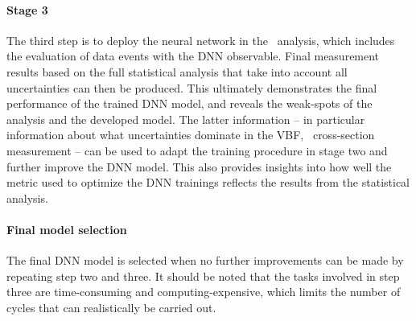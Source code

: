 \paragraph{Stage 3}
The third step is to deploy the neural network in the \HWW\ analysis, which includes the evaluation of data events with the DNN observable. Final measurement results based on the full statistical analysis that take into account all uncertainties can then be produced. This ultimately demonstrates the final performance of the trained DNN model, and reveals the weak-spots of the analysis and the developed model.
The latter information -- in particular information about what uncertainties dominate in the VBF, \HWW\ cross-section measurement -- can be used to adapt the training procedure in stage two and further improve the DNN model.
This also provides insights into how well the metric used to optimize the DNN trainings reflects the results from the statistical analysis.

\paragraph{Final model selection}
The final DNN model is selected when no further improvements can be made by repeating step two and three. It should be noted that the tasks involved in step three are time-consuming and computing-expensive, which limits the number of cycles that can realistically be carried out.




